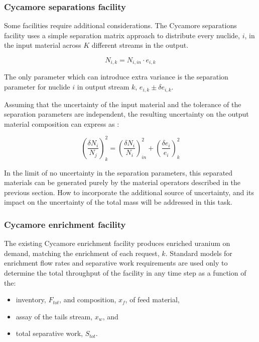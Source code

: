 \documentclass[dvips,12pt]{article}
\begin{document}
\subsubsection{Cycamore separations facility}

Some facilities require additional considerations.
The Cycamore separations facility uses a simple
separation matrix approach to distribute every
nuclide, $i$, in the input material across $K$
different streams in the output.

\begin{equation}
N_{i,k} = N_{i,in} \cdot e_{i,k}
\end{equation}

The only parameter which can introduce extra
variance is the separation parameter for nuclide
$i$ in output stream $k$, $e_{i,k} \pm \delta
e_{i,k}$.

Assuming that the uncertainty of the input
material and the tolerance of the separation
parameters are independent, the resulting
uncertainty on the output material composition can
express as :

\begin{equation}
\left(\frac{\delta N_{i}}{N_{j}}\right)^{2}_k = \left(\frac{\delta N_{i}}{N_{i}}\right)^{2}_{in} +  \left(\frac{\delta e_{i}}{e_{i}}\right)^{2}_k 
\end{equation}

In the limit of no uncertainty in the separation
parameters, this separated materials can be
generated purely by the material operators
described in the previous section.  How to
incorporate the additional source of uncertainty,
and its impact on the uncertainty of the total
mass will be addressed in this task.

\subsubsection{Cycamore enrichment facility}

The existing Cycamore enrichment facility produces
enriched uranium on demand, matching the
enrichment of each request, $k$.  Standard models
for enrichment flow rates and separative work
requirements are used only to determine the total
throughput of the facility in any time step as a
function of the:
\begin{itemize}
\item inventory, $F_{tot}$, and composition,
  $x_f$, of feed material,
\item assay of the tails stream, $x_w$, and
\item total separative work, $S_{tot}$.
\end{itemize}
\end{document}
